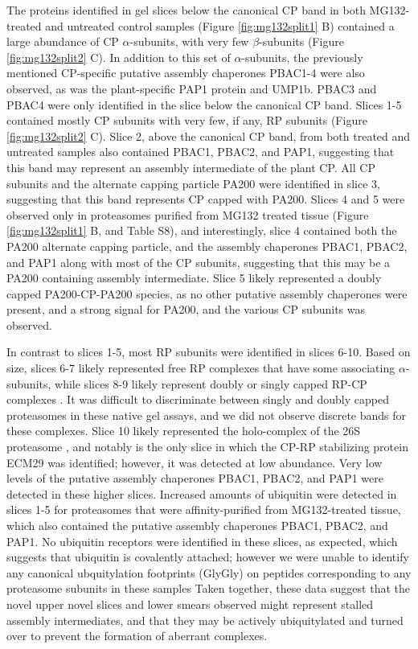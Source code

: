 The proteins identified in gel slices below the canonical CP band in both MG132-treated and untreated control samples (Figure \ref{fig:mg132split1} B) contained a large abundance of CP $\alpha$-subunits, with very few $\beta$-subunits (Figure \ref{fig:mg132split2} C). In addition to this set of $\alpha$-subunits, the previously mentioned CP-specific putative assembly chaperones PBAC1-4 were also observed, as was the plant-specific PAP1 protein and UMP1b. PBAC3 and PBAC4 were only identified in the slice below the canonical CP band. Slices 1-5 contained mostly CP subunits with very few, if any, RP subunits (Figure \ref{fig:mg132split2} C). Slice 2, above the canonical CP band, from both treated and untreated samples also contained PBAC1, PBAC2, and PAP1, suggesting that this band may represent an assembly intermediate of the plant CP. All CP subunits and the alternate capping particle PA200 were identified in slice 3, suggesting that this band represents CP capped with PA200. Slices 4 and 5 were observed only in proteasomes purified from MG132 treated tissue (Figure \ref{fig:mg132split1} B, and Table S8), and interestingly, slice 4 contained both the PA200 alternate capping particle, and the assembly chaperones PBAC1, PBAC2, and PAP1 along with most of the CP subunits, suggesting that this may be a PA200 containing assembly intermediate. Slice 5 likely represented a doubly capped PA200-CP-PA200 species, as no other putative assembly chaperones were present, and a strong signal for PA200, and the various CP subunits was observed. 

In contrast to slices 1-5, most RP subunits were identified in slices 6-10. Based on size, slices 6-7 likely represented free RP complexes that have some associating $\alpha$-subunits, while slices 8-9 likely represent doubly or singly capped RP-CP complexes \citep{book10}. It was difficult to discriminate between singly and doubly capped proteasomes in these native gel assays, and we did not observe discrete bands for these complexes. Slice 10 likely represented the holo-complex of the 26S proteasome \citep{book10}, and notably is the only slice in which the CP-RP stabilizing protein ECM29 was identified; however, it was detected at low abundance. Very low levels of the putative assembly chaperones PBAC1, PBAC2, and PAP1 were detected in these higher slices. Increased amounts of ubiquitin were detected in slices 1-5 for proteasomes that were affinity-purified from MG132-treated tissue, which also contained the putative assembly chaperones PBAC1, PBAC2, and PAP1. No ubiquitin receptors were identified in these slices, as expected, which suggests that ubiquitin is covalently attached; however we were unable to identify any canonical ubquitylation footprints (GlyGly) \citep{wang06} on peptides corresponding to any proteasome subunits in these samples  Taken together, these data suggest that the novel upper novel slices and lower smears observed might represent stalled assembly intermediates, and that they may be actively ubiquitylated and turned over to prevent the formation of aberrant complexes.
 
